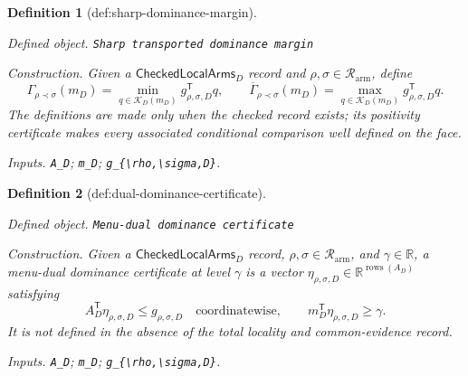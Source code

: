 \documentclass{article}
\newtheorem{definition}{Definition}
\begin{document}
\begin{definition}[def:sharp-dominance-margin]\label{def:sharp-dominance-margin}
\par\smallskip\noindent\emph{Defined object.} \texttt{Sharp transported dominance margin}
\par\smallskip\noindent\emph{Construction.} Given a \(\mathsf{CheckedLocalArms}_D\) record and \(\rho,\sigma\in\mathcal R_{\mathrm{arm}}\), define
\[
\Gamma_{\rho\prec\sigma}(m_D)
=\min_{q\in\mathcal K_D(m_D)}g_{\rho,\sigma,D}^{\mathsf T}q,
\qquad
\overline\Gamma_{\rho\prec\sigma}(m_D)
=\max_{q\in\mathcal K_D(m_D)}g_{\rho,\sigma,D}^{\mathsf T}q.
\]
The definitions are made only when the checked record exists; its positivity certificate makes every associated conditional comparison well defined on the face.
\par\smallskip\noindent\emph{Inputs.} \texttt{A\_\allowbreak{}D}; \texttt{m\_\allowbreak{}D}; \texttt{g\_\allowbreak{}\{\textbackslash{}\allowbreak{}rho,\allowbreak{}\textbackslash{}\allowbreak{}sigma,\allowbreak{}D\}\allowbreak{}}.
\end{definition}

\begin{definition}[def:dual-dominance-certificate]\label{def:dual-dominance-certificate}
\par\smallskip\noindent\emph{Defined object.} \texttt{Menu-\allowbreak{}dual dominance certificate}
\par\smallskip\noindent\emph{Construction.} Given a \(\mathsf{CheckedLocalArms}_D\) record, \(\rho,\sigma\in\mathcal R_{\mathrm{arm}}\), and \(\gamma\in\mathbb R\), a menu-dual dominance certificate at level \(\gamma\) is a vector \(\eta_{\rho,\sigma,D}\in\mathbb R^{\operatorname{rows}(A_D)}\) satisfying
\[
A_D^{\mathsf T}\eta_{\rho,\sigma,D}
\leq g_{\rho,\sigma,D}
\quad\text{coordinatewise},
\qquad
m_D^{\mathsf T}\eta_{\rho,\sigma,D}\geq\gamma.
\]
It is not defined in the absence of the total locality and common-evidence record.
\par\smallskip\noindent\emph{Inputs.} \texttt{A\_\allowbreak{}D}; \texttt{m\_\allowbreak{}D}; \texttt{g\_\allowbreak{}\{\textbackslash{}\allowbreak{}rho,\allowbreak{}\textbackslash{}\allowbreak{}sigma,\allowbreak{}D\}\allowbreak{}}.
\end{definition}
\end{document}
